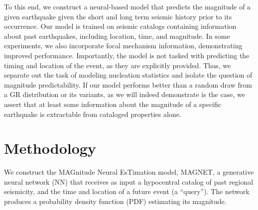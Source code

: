 \documentclass[pdflatex]{sn-jnl}
\newcommand{\neri}[1]{{\textcolor{cyan}{#1}}}
\begin{document}

To this end, we construct a neural-based model that predicts the magnitude of a given earthquake given the short and long term seismic history prior to its occurrence. Our model is trained on seismic catalogs containing information about past earthquakes, including location, time, and magnitude. In some experiments, we also incorporate focal mechanism information, demonstrating improved performance. Importantly, the model is not tasked with predicting the timing and location of the event, as they are explicitly provided. Thus, we separate out the task of modeling nucleation statistics and isolate the question of magnitude predictability. If our model performs better than a random draw from a GR distribution or its variants, as we will indeed demonstrate is the case, we assert that at least some information about the magnitude of a specific earthquake is extractable from cataloged properties alone. 





\section{Methodology}
We construct the MAGnitude Neural EsTimation model, MAGNET, a generative neural network (NN) that receives as input a hypocentral catalog of past regional seismicity, and the time and location of a future event (a ``query''). The network produces a probability density function (PDF) estimating its magnitude. 
\end{document}
